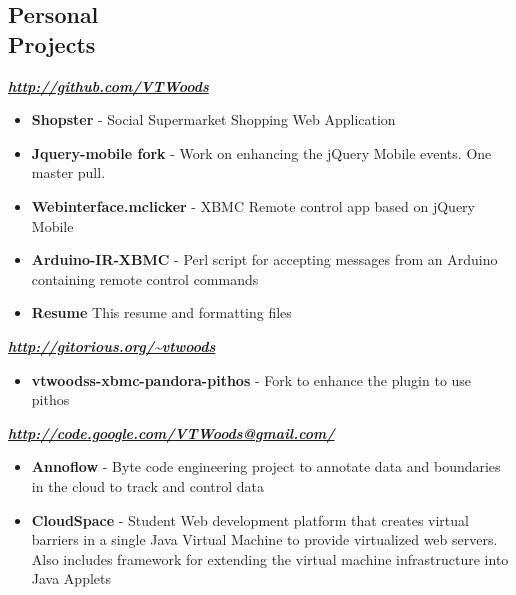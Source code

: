 \documentclass[line,margin]{res}
\begin{document}
\begin{resume}
\section{Personal \\ Projects}
\textbf{\emph{\url{http://github.com/VTWoods}}}
\begin{itemize} \itemsep -2pt %
\item \textbf{Shopster} - Social Supermarket Shopping Web Application
\item \textbf{Jquery-mobile fork} - Work on enhancing the jQuery Mobile events. One master pull.
\item \textbf{Webinterface.mclicker} - XBMC Remote control app based on jQuery Mobile 
\item \textbf{Arduino-IR-XBMC} - Perl script for accepting messages from an Arduino containing remote control commands
\item \textbf{Resume} This resume and formatting files
\end{itemize}
\textbf{\emph{\url{http://gitorious.org/~vtwoods}}}
\begin{itemize} \itemsep -2pt %
\item \textbf{vtwoodss-xbmc-pandora-pithos} - Fork to enhance the plugin to use pithos
\end{itemize}
\textbf{\emph{\url{http://code.google.com/VTWoods@gmail.com/}}}
\begin{itemize} \itemsep -2pt %
\item \textbf{Annoflow} - Byte code engineering project to annotate data and boundaries in the cloud to track and control data
\item \textbf{CloudSpace} - Student Web development platform that creates virtual barriers in a single Java Virtual Machine to provide virtualized web servers.  Also includes framework for extending the virtual machine infrastructure into Java Applets
\end{itemize}


\end{resume}
\end{document}
